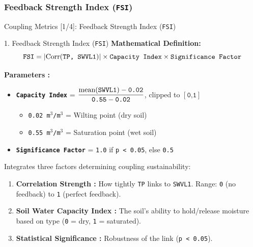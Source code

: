 \documentclass[8pt, aspectratio=169]{beamer}
\begin{document}
\subsubsection{Feedback Strength Index (\texttt{FSI})}
\begin{frame}{Coupling Metrics [1/4]: Feedback Strength Index (\texttt{FSI})}
    \vspace{-0.3cm}
    \footnotesize
    \begin{block}{1. Feedback Strength Index (\texttt{FSI})}
        \textbf{Mathematical Definition:}
        \begin{equation}
            \text{\texttt{FSI}} = |\text{Corr}(\text{\texttt{TP, SWVL1}})| \times \text{\texttt{Capacity Index}} \times \text{\texttt{Significance Factor}}
        \end{equation}

        \textbf{Parameters :}
        \begin{itemize}
            \item \textbf{\texttt{Capacity Index}} = $\dfrac{\text{mean}(\text{\texttt{SWVL1}}) - \texttt{0.02}}{\texttt{0.55} - \texttt{0.02}}$, clipped to $[\texttt{0,1}]$
            \begin{itemize}
                \footnotesize
                \item \texttt{0.02 m$^3$/m$^3$} = Wilting point (dry soil)\footnotemark[3]
                \item \texttt{0.55 m$^3$/m$^3$} = Saturation point (wet soil)\footnotemark[3]
            \end{itemize}
            \item \textbf{\texttt{Significance Factor}} = \texttt{1.0} if \texttt{p < 0.05}, else \texttt{0.5}
        \end{itemize}

        Integrates three factors determining coupling sustainability:
        \begin{enumerate}
            \item \textbf{Correlation Strength :} How tightly \texttt{TP} links to \texttt{SWVL1}. Range: \texttt{0} (no feedback) to \texttt{1} (perfect feedback).
            \item \textbf{Soil Water Capacity Index :} The soil's ability to hold/release moisture based on type (\texttt{0} = dry, \texttt{1} = saturated).
            \item \textbf{Statistical Significance :} Robustness of the link (\texttt{p < 0.05}).
        \end{enumerate}
    \end{block}

\end{frame}
\end{document}
